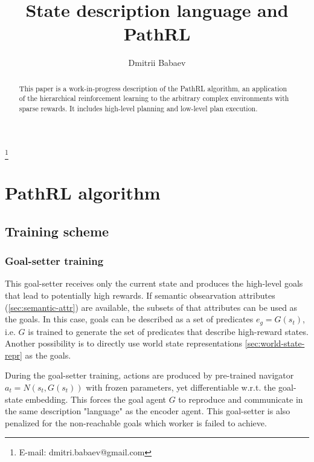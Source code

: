 \documentclass[acmsmall, nonacm]{acmart}
\begin{document}
\title{State description language and PathRL}

\author{Dmitrii Babaev} \thanks{E-mail: dmitri.babaev@gmail.com}

\begin{abstract}
This paper is a work-in-progress description of the PathRL algorithm, an application of the hierarchical reinforcement learning to the arbitrary complex environments with sparse rewards. It includes high-level planning and low-level plan execution.
\end{abstract}

\maketitle

\section{PathRL algorithm}

\subsection{Training scheme}

\subsubsection{Goal-setter training}

This goal-setter receives only the current state and produces the high-level goals that lead to potentially high rewards. If semantic obsearvation attributes (\ref{sec:semantic-attr}) are available, the subsets of that attributes can be used as the goals. In this case, goals can be described as a set of predicates $e_g = G(s_t)$, i.e. $G$ is trained to generate the set of predicates that describe high-reward states. Another possibility is to directly use world state representations \ref{sec:world-state-repr} as the goals.

During the goal-setter training, actions are produced by pre-trained navigator $a_t = N(s_t, G(s_t))$ with frozen parameters, yet differentiable w.r.t. the goal-state embedding. This forces the goal agent $G$ to reproduce and communicate in the same description "language" as the encoder agent. This goal-setter is also penalized for the non-reachable goals which worker is failed to achieve.
\end{document}
